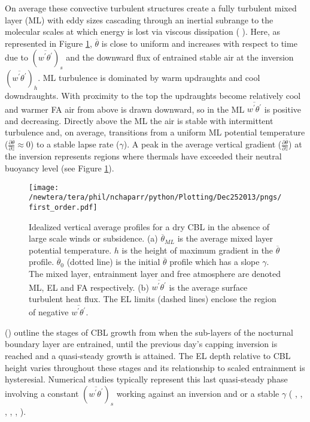 On average these convective turbulent structures create a fully turbulent mixed layer (\acs{ML}) with eddy sizes cascading through an inertial subrange to the molecular scales at which energy is lost via viscous dissipation (\citeauthor{Stull-BLMetIntro} \citeyear{Stull-BLMetIntro}).  Here, as represented in Figure \ref{fig:1storder}, $\overline{\theta}$ is close to uniform and increases with respect to time due to $(\overline{w^{'}\theta^{'}})_{s}$ and the downward flux of entrained stable air at the inversion $(\overline{w^{'}\theta^{'}})_{h}$.  \acs{ML} turbulence is dominated by warm updraughts and cool downdraughts.  With proximity to the top the updraughts become relatively cool and warmer \acs{FA} air from above is drawn downward, so in the \acs{ML} $\overline{w^{'}\theta^{'}}$ is positive and decreasing.  Directly above the \acs{ML} the air is stable with intermittent turbulence and, on average, transitions from a uniform \acs{ML} potential temperature ($\frac{\partial \overline{\theta}}{\partial z} \approx 0$) to a stable lapse rate ($\gamma$).  A peak in the average vertical gradient ($\frac{\partial \overline{\theta}}{\partial z}$) at the inversion represents regions where thermals have exceeded their neutral buoyancy level (see Figure \ref{fig:1storder}).\\

\begin{figure}[htbp]
    \centering
    \texttt{[image: /newtera/tera/phil/nchaparr/python/Plotting/Dec252013/pngs/first\_order.pdf]}
    \caption[Idealized vertical average profiles for a dry \acs{CBL}]{Idealized vertical average profiles for a dry \acs{CBL} in the absence of large scale winds or subsidence. (a) $\overline{\theta}_{ML}$ is the average mixed layer potential temperature. $h$ is the height of maximum gradient in the $\overline{\theta}$ profile. $\overline{\theta}_{0}$ (dotted line) is the initial $\overline{\theta}$ profile which has a slope $\gamma$. The mixed layer, entrainment layer and free atmosphere are denoted \acs{ML}, \acs{EL} and \acs{FA} respectively.  (b) $\overline{w^{'}\theta^{'}}$ is the average surface turbulent heat flux.  The EL limits (dashed lines) enclose the region of negative $\overline{w^{'}\theta^{'}}$.}
    \label{fig:1storder}   %
\end{figure}

\citeauthor{StullNelEl} (\citeyear{StullNelEl}) outline the stages of \acs{CBL} growth from when the sub-layers of the nocturnal boundary layer are entrained, until the previous day's capping inversion is reached and a quasi-steady growth is attained.  The \acs{EL} depth relative to \acs{CBL} height varies throughout these stages and its relationship to scaled entrainment is hysteresial.  Numerical studies typically represent this last quasi-steady phase involving a constant $(\overline{w^{'}\theta^{'}})_{s}$ working against an inversion and or a stable $\gamma$ (\citeauthor{SchmidtSchu} \citeyear{SchmidtSchu}, \citeauthor{Sorbjan} \citeyear{Sorbjan}, \citeauthor{SullMoengStev} \citeyear{SullMoengStev}, \citeauthor{FedConzMir04} \citeyear{FedConzMir04}, \citeauthor{BrooksFowler2} \citeyear{BrooksFowler2}, \citeauthor{GarciaMellado} \citeyear{GarciaMellado}).  

